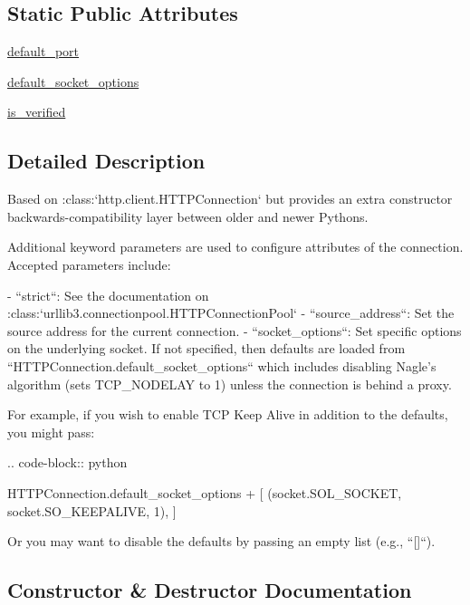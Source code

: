 \subsection*{Static Public Attributes}
\begin{DoxyCompactItemize}
\item 
\hyperlink{classpip_1_1__vendor_1_1urllib3_1_1connection_1_1HTTPConnection_a8a50af5ab906f795fbe4e6661a850914}{default\+\_\+port}
\item 
\hyperlink{classpip_1_1__vendor_1_1urllib3_1_1connection_1_1HTTPConnection_a1c33c719c092837e02e22aeb2605acc3}{default\+\_\+socket\+\_\+options}
\item 
\hyperlink{classpip_1_1__vendor_1_1urllib3_1_1connection_1_1HTTPConnection_a7187ea97b79a6a5aa8ff2dc3f6a66a73}{is\+\_\+verified}
\end{DoxyCompactItemize}


\subsection{Detailed Description}
\begin{DoxyVerb}Based on :class:`http.client.HTTPConnection` but provides an extra constructor
backwards-compatibility layer between older and newer Pythons.

Additional keyword parameters are used to configure attributes of the connection.
Accepted parameters include:

- ``strict``: See the documentation on :class:`urllib3.connectionpool.HTTPConnectionPool`
- ``source_address``: Set the source address for the current connection.
- ``socket_options``: Set specific options on the underlying socket. If not specified, then
  defaults are loaded from ``HTTPConnection.default_socket_options`` which includes disabling
  Nagle's algorithm (sets TCP_NODELAY to 1) unless the connection is behind a proxy.

  For example, if you wish to enable TCP Keep Alive in addition to the defaults,
  you might pass:

  .. code-block:: python

     HTTPConnection.default_socket_options + [
         (socket.SOL_SOCKET, socket.SO_KEEPALIVE, 1),
     ]

  Or you may want to disable the defaults by passing an empty list (e.g., ``[]``).
\end{DoxyVerb}
 

\subsection{Constructor \& Destructor Documentation}
\mbox{\label{classpip_1_1__vendor_1_1urllib3_1_1connection_1_1HTTPConnection_ad63fe1e5e68008fee982ea14c3f31606}} 

